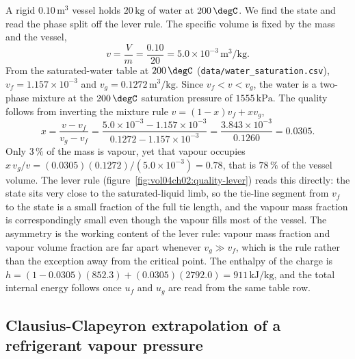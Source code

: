 A rigid $0.10\,\text{m}^3$ vessel holds $20\,\text{kg}$ of water at
$200\,\degC$. We find the state and read the phase split off the lever
rule. The specific volume is fixed by the mass and the vessel,
\[
v = \frac{V}{m} = \frac{0.10}{20} = 5.0\times 10^{-3}\,\text{m}^3/
\text{kg}.
\]
From the saturated-water table at $200\,\degC$
(\texttt{data/water\_saturation.csv}), $v_f = 1.157\times 10^{-3}$ and
$v_g = 0.1272\,\text{m}^3/\text{kg}$. Since $v_f < v < v_g$, the water is
a two-phase mixture at the $200\,\degC$ saturation pressure of
$1555\,\text{kPa}$. The quality follows from inverting the mixture rule
$v = (1-x)v_f + x v_g$,
\[
x = \frac{v - v_f}{v_g - v_f} = \frac{5.0\times 10^{-3} - 1.157\times
10^{-3}}{0.1272 - 1.157\times 10^{-3}} = \frac{3.843\times 10^{-3}}{0.1260}
= 0.0305.
\]
Only $3\,\%$ of the mass is vapour, yet that vapour occupies
$x\, v_g/v = (0.0305)(0.1272)/(5.0\times 10^{-3}) = 0.78$, that is
$78\,\%$ of the vessel volume. The lever rule
(figure~\ref{fig:vol04ch02:quality-lever}) reads this directly: the state
sits very close to the saturated-liquid limb, so the tie-line segment
from $v_f$ to the state is a small fraction of the full tie length, and
the vapour mass fraction is correspondingly small even though the vapour
fills most of the vessel. The asymmetry is the working content of the
lever rule: vapour mass fraction and vapour volume fraction are far apart
whenever $v_g \gg v_f$, which is the rule rather than the exception away
from the critical point. The enthalpy of the charge is $h = (1 -
0.0305)(852.3) + (0.0305)(2792.0) = 911\,\text{kJ}/\text{kg}$, and the
total internal energy follows once $u_f$ and $u_g$ are read from the same
table row.

\subsection{Clausius-Clapeyron extrapolation of a refrigerant vapour
pressure}

